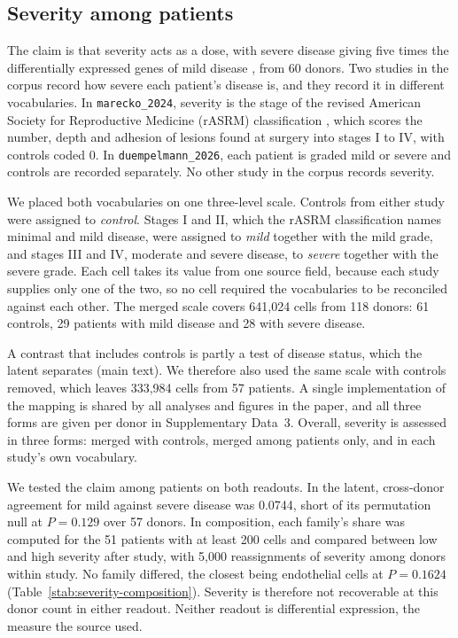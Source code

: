 \subsection{Severity among patients}

The claim is that severity acts as a dose, with severe disease giving five
times the differentially expressed genes of mild disease
\citep{duempelmann2026endometrium}, from 60 donors.
Two studies in the corpus record how severe each patient's disease is, and
they record it in different vocabularies. In \texttt{marecko\_2024},
severity is the stage of the revised American Society for Reproductive
Medicine (rASRM) classification \citep{asrm1997revised}, which scores the
number, depth and adhesion of lesions found at surgery into stages I to
IV, with controls coded 0. In \texttt{duempelmann\_2026}, each patient is
graded mild or severe and controls are recorded separately. No other study
in the corpus records severity.

We placed both vocabularies on one three-level scale. Controls from either
study were assigned to \emph{control}. Stages I and II, which the rASRM
classification names minimal and mild disease, were assigned to
\emph{mild} together with the mild grade, and stages III and IV, moderate
and severe disease, to \emph{severe} together with the severe grade. Each
cell takes its value from one source field, because each study supplies
only one of the two, so no cell required the vocabularies to be reconciled
against each other. The merged scale covers 641{,}024 cells from 118
donors: 61 controls, 29 patients with mild disease and 28 with severe
disease.

A contrast that includes controls is partly a test of disease status,
which the latent separates (main text). We therefore also used the
same scale with controls removed, which leaves 333{,}984 cells from 57
patients. A single implementation of the mapping is shared by all 
analyses and figures in the paper, and all three forms are given per 
donor in Supplementary Data~3. Overall, severity is assessed
in three forms: merged with controls, merged among patients only, and in
each study's own vocabulary.

We tested the claim among patients on both readouts. In the latent,
cross-donor agreement for mild against severe disease was 0.0744, short of
its permutation null at $P = 0.129$ over 57 donors. In composition, each
family's share was computed for the 51 patients with at least 200 cells and
compared between low and high severity after study, with 5{,}000
reassignments of severity among donors within study. No family differed,
the closest being endothelial cells at $P = 0.1624$
(Table~\ref{stab:severity-composition}). Severity is therefore not
recoverable at this donor count in either readout. Neither readout is
differential expression, the measure the source used.

